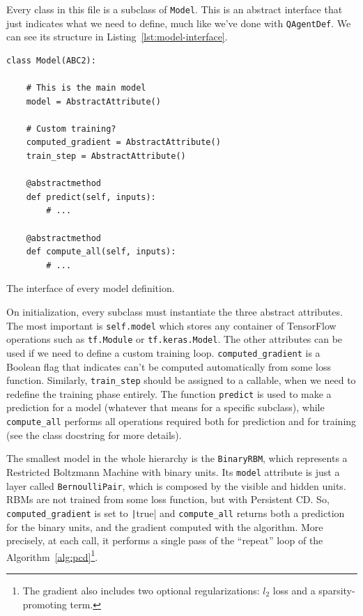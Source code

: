 Every class in this file is a subclass of \texttt{Model}. This is an abstract
interface that just indicates what we need to define, much like we've done
with \texttt{QAgentDef}. We can see its structure in
Listing~\ref{lst:model-interface}.
\begin{listing}
\begin{verbatim}
class Model(ABC2):

    # This is the main model
    model = AbstractAttribute()

    # Custom training?
    computed_gradient = AbstractAttribute()
    train_step = AbstractAttribute()

    @abstractmethod
    def predict(self, inputs):
        # ...

    @abstractmethod
    def compute_all(self, inputs):
        # ...
\end{verbatim}
\caption{The interface of every model definition.}
\label{lst:model-interface}
\end{listing}
On initialization, every subclass must instantiate the three abstract
attributes. The most important is \verb|self.model| which stores any container
of TensorFlow operations such as \verb|tf.Module| or \verb|tf.keras.Model|.
The other attributes can be used if we need to define a custom training loop.
\verb|computed_gradient| is a Boolean flag that indicates can't be computed
automatically from some loss function. Similarly, \verb|train_step| should be
assigned to a callable, when we need to redefine the training phase entirely.
The function \texttt{predict} is used to make a prediction for a model
(whatever that means for a specific subclass), while \verb|compute_all|
performs all operations required both for prediction and for training (see the
class docstring for more details).

The smallest model in the whole hierarchy is the \texttt{BinaryRBM}, which
represents a Restricted Boltzmann Machine with binary units. Its
\texttt{model} attribute is just a layer called \texttt{BernoulliPair}, which
is composed by the visible and hidden units. RBMs are not trained from some
loss function, but with Persistent CD. So, \verb|computed_gradient| is set to
\texttt|true| and \verb|compute_all| returns both a
prediction for the binary units, and the gradient computed with the algorithm.
More precisely, at each call, it performs a single pass of the ``repeat'' loop
of the Algorithm~\vref{alg:pcd}\footnote{The gradient also includes two
optional regularizations: $l_2$ loss and a sparsity-promoting term.}.

